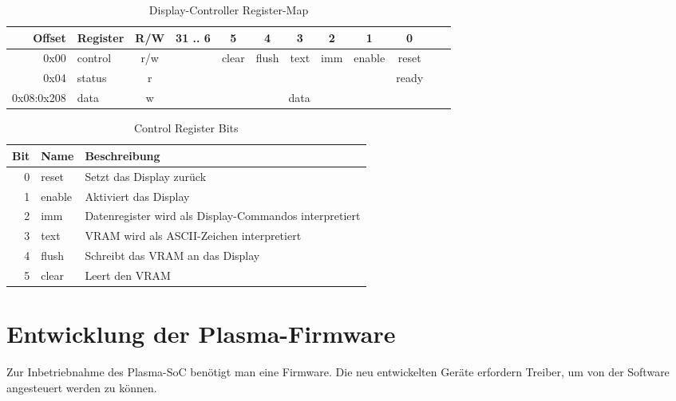 \begin{table}[!htbp]
	\bigskip
	\centering
	\begin{tabular}{ | r | l | c | c | c | c | c | c | c | c | c | c |}
		\hline
		\textbf{Offset} & \textbf{Register} & \textbf{R/W} & \textbf{31 .. 6} & \textbf{5} & \textbf{4} & \textbf{3} & \textbf{2} & \textbf{1} & \textbf{0} \\
		\hline
		0x00 & control & r/w & & clear & flush & text & imm & enable & reset \\
		\hline
		0x04 & status & r & \multicolumn{6}{c|}{}& ready \\
		\hline
		0x08:0x208 & data & w & \multicolumn{7}{c|}{data} \\
		\hline
	\end{tabular}
	
	\caption{Display-Controller Register-Map}
	\label{tab:oled_controller_reg_map}
\end{table}


\begin{table}[!htbp]
	\bigskip
	\centering
	\begin{tabular}{ | r | l | l | }
		\hline
		\textbf{Bit} & \textbf{Name} & \textbf{Beschreibung} \\
		\hline
		0 & reset & Setzt das Display zurück \\
		\hline
		1 & enable & Aktiviert das Display\\
		\hline
		2 & imm & Datenregister wird als Display-Commandos interpretiert \\
		\hline
		3 & text & VRAM wird als ASCII-Zeichen interpretiert \\
		\hline
		4 & flush & Schreibt das VRAM an das Display \\
		\hline
		5 & clear & Leert den VRAM \\
		\hline
	\end{tabular}
	
	\caption{Control Register Bits}
	\label{tab:oled_controller_control_reg_bits}
\end{table}

\section{Entwicklung der Plasma-Firmware}
\label{sec:plasma_fw}

Zur Inbetriebnahme des Plasma-\gls{SoC} benötigt man eine \gls{Firmware}. Die neu entwickelten Geräte erfordern Treiber, um von der Software angesteuert werden zu können. 

